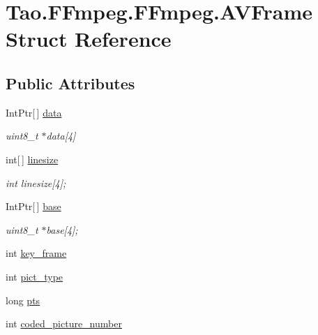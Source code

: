 \hypertarget{struct_tao_1_1_f_fmpeg_1_1_f_fmpeg_1_1_a_v_frame}{
\section{Tao.FFmpeg.FFmpeg.AVFrame Struct Reference}
\label{struct_tao_1_1_f_fmpeg_1_1_f_fmpeg_1_1_a_v_frame}
}
\subsection*{Public Attributes}
\begin{DoxyCompactItemize}
\item 
IntPtr\mbox{[}$\,$\mbox{]} \hyperlink{struct_tao_1_1_f_fmpeg_1_1_f_fmpeg_1_1_a_v_frame_abbc10f506e044b7b2ecd06c4759bc18c}{data}
\begin{DoxyCompactList}\small\item\em uint8\_\-t $\ast$data\mbox{[}4\mbox{]} \item\end{DoxyCompactList}\item 
int\mbox{[}$\,$\mbox{]} \hyperlink{struct_tao_1_1_f_fmpeg_1_1_f_fmpeg_1_1_a_v_frame_a545ccc4117e6fec867bf0039e17e35b4}{linesize}
\begin{DoxyCompactList}\small\item\em int linesize\mbox{[}4\mbox{]}; \item\end{DoxyCompactList}\item 
IntPtr\mbox{[}$\,$\mbox{]} \hyperlink{struct_tao_1_1_f_fmpeg_1_1_f_fmpeg_1_1_a_v_frame_ae99f3b732796ed1a4a5d254e3bb9e8f1}{base}
\begin{DoxyCompactList}\small\item\em uint8\_\-t $\ast$base\mbox{[}4\mbox{]}; \item\end{DoxyCompactList}\item 
int \hyperlink{struct_tao_1_1_f_fmpeg_1_1_f_fmpeg_1_1_a_v_frame_ace0f1bcb00e7e64c405f2e8188152476}{key\_\-frame}
\item 
int \hyperlink{struct_tao_1_1_f_fmpeg_1_1_f_fmpeg_1_1_a_v_frame_a8eb94a7270bc5403a2c591f11c93bdfe}{pict\_\-type}
\item 
long \hyperlink{struct_tao_1_1_f_fmpeg_1_1_f_fmpeg_1_1_a_v_frame_ab461a5e1e7beb670cb18e0a04ee1b5d5}{pts}
\item 
int \hyperlink{struct_tao_1_1_f_fmpeg_1_1_f_fmpeg_1_1_a_v_frame_af197a9d230da7ed828265558b6abc063}{coded\_\-picture\_\-number}

\end{DoxyCompactItemize}
